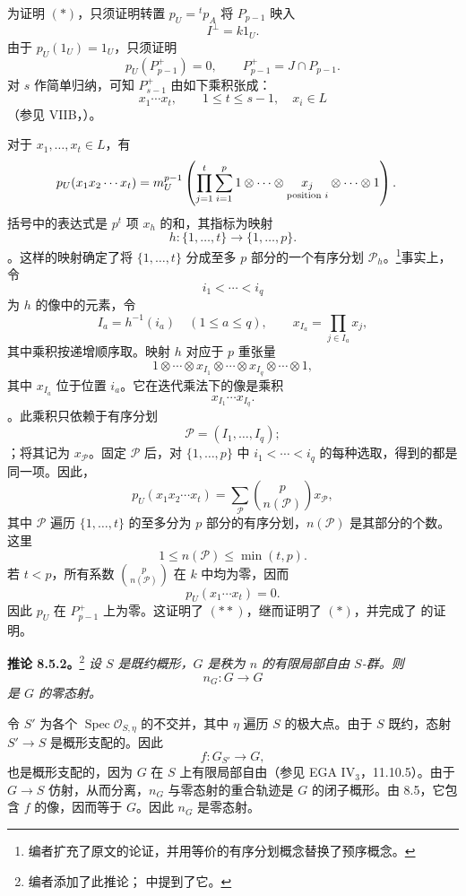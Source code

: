 为证明 \((*)\)，只须证明转置 \(p_U={}^tp_A\) 将 \(P_{p-1}\) 映入
\[
  I^\perp=k1_U.
\]
由于 \(p_U(1_U)=1_U\)，只须证明
\[
  \tag{**}\label{sga3:vii:corollary:8-5-1:equation:double-star}
  p_U(P_{p-1}^+)=0,
  \qquad
  P_{p-1}^+=J\cap P_{p-1}.
\]
对 \(s\) 作简单归纳，可知 \(P_{s-1}^+\) 由如下乘积张成：
\[
  x_1\cdots x_t,
  \qquad
  1\le t\le s-1,\quad x_i\in L
\]
（参见 VIIB，）。

对于 \(x_1,\ldots,x_t\in L\)，有
\[
\begin{aligned}
  p_U(x_1x_2\cdots x_t)
  &=
  m_U^{p-1}
  \left(
    \prod_{j=1}^t
    \sum_{i=1}^p
    1\otimes\cdots\otimes
    \underset{\text{\scriptsize position \(i\)}}{x_j}
    \otimes\cdots\otimes1
  \right).
\end{aligned}
\]
括号中的表达式是 \(p^t\) 项 \(x_h\) 的和，其指标为映射
\[
  h:\{1,\ldots,t\}\longrightarrow\{1,\ldots,p\}.
\]
。这样的映射确定了将 \(\{1,\ldots,t\}\) 分成至多 \(p\) 部分的一个有序分划 \(\mathcal P_h\)。\footnote{编者扩充了原文的论证，并用等价的有序分划概念替换了预序概念。}事实上，令
\[
  i_1<\cdots<i_q
\]
为 \(h\) 的像中的元素，令
\[
  I_a=h^{-1}(i_a)
  \quad(1\le a\le q),
  \qquad
  x_{I_a}=\prod_{j\in I_a}x_j,
\]
其中乘积按递增顺序取。映射 \(h\) 对应于 \(p\) 重张量
\[
  1\otimes\cdots\otimes x_{I_1}\otimes\cdots\otimes
  x_{I_q}\otimes\cdots\otimes1,
\]
其中 \(x_{I_a}\) 位于位置 \(i_a\)。它在迭代乘法下的像是乘积
\[
  x_{I_1}\cdots x_{I_q}.
\]
。此乘积只依赖于有序分划
\[
  \mathcal P=(I_1,\ldots,I_q);
\]
；将其记为 \(x_{\mathcal P}\)。固定 \(\mathcal P\) 后，对 \(\{1,\ldots,p\}\) 中 \(i_1<\cdots<i_q\) 的每种选取，得到的都是同一项。因此，
\[
  p_U(x_1x_2\cdots x_t)
  =
  \sum_{\mathcal P}
  \binom{p}{n(\mathcal P)}x_{\mathcal P},
\]
其中 \(\mathcal P\) 遍历 \(\{1,\ldots,t\}\) 的至多分为 \(p\) 部分的有序分划，\(n(\mathcal P)\) 是其部分的个数。这里
\[
  1\le n(\mathcal P)\le\min(t,p).
\]
若 \(t<p\)，所有系数 \(\binom{p}{n(\mathcal P)}\) 在 \(k\) 中均为零，因而
\[
  p_U(x_1\cdots x_t)=0.
\]
因此 \(p_U\) 在 \(P_{p-1}^+\) 上为零。这证明了 \((**)\)，继而证明了 \((*)\)，并完成了  的证明。

\medskip
\noindent\textbf{推论 8.5.2。}\footnote{编者添加了此推论； 中提到了它。}
\label{sga3:VIIA:8.5.2}
\textit{设 \(S\) 是既约概形，\(G\) 是秩为 \(n\) 的有限局部自由 \(S\)-群。则
\[
  n_G:G\longrightarrow G
\]
是 \(G\) 的零态射。}

令 \(S'\) 为各个 \(\operatorname{Spec}\mathcal O_{S,\eta}\) 的不交并，其中 \(\eta\) 遍历 \(S\) 的极大点。由于 \(S\) 既约，态射 \(S'\to S\) 是概形支配的。因此
\[
  f:G_{S'}\longrightarrow G,
\]
也是概形支配的，因为 \(G\) 在 \(S\) 上有限局部自由（参见 EGA IV\(_3\)，11.10.5）。由于 \(G\to S\) 仿射，从而分离，\(n_G\) 与零态射的重合轨迹是 \(G\) 的闭子概形。由 8.5，它包含 \(f\) 的像，因而等于 \(G\)。因此 \(n_G\) 是零态射。

